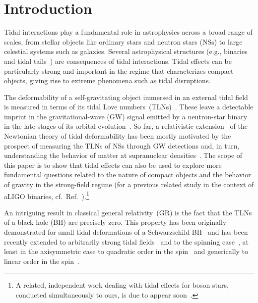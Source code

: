 \documentclass[aps,twocolumn,showpacs,preprintnumbers,nofootinbib,prd,superscriptaddress,groupedaddress,10pt]{revtex4-1}
\begin{document}
\tableofcontents

\section{Introduction}


Tidal interactions play a fundamental role in astrophysics across a broad range of scales, from stellar objects like ordinary stars and neutron stars (NSs) to large celestial systems such as galaxies. Several astrophysical structures (e.g., binaries and tidal tails~\cite{Toomre:1972vt,1977ApJ...213..183P}) are consequences of tidal interactions. Tidal effects can be particularly strong and important in the regime that characterizes compact objects, giving rise to extreme phenomena such as tidal disruptions. 
%

The deformability of a self-gravitating object immersed in an external tidal field is measured in terms of its tidal Love numbers~(TLNs)~\cite{Murraybook,PoissonWill}. These leave a detectable imprint in the gravitational-wave (GW) signal emitted by a neutron-star binary in the late stages of its orbital evolution~\cite{Flanagan:2007ix,Hinderer:2007mb,Hinderer:2016eia}.
%
So far, a relativistic extension~\cite{Hinderer:2007mb,Binnington:2009bb,Damour:2009vw} of the Newtonian theory of tidal deformability has been mostly motivated by the prospect of measuring the TLNs of NSs through GW detections and, in turn, understanding the behavior of matter at supranuclear densities~\cite{Lattimer:2004pg,Hinderer:2009ca,Postnikov:2010yn,Vines:2011ud,Damour:2012yf,DelPozzo:2013ala,Maselli:2013rza}.
%
The scope of this paper is to show that tidal effects can also be used to explore more fundamental questions related to the nature of compact objects and the behavior of gravity in the strong-field regime (for a previous related study in the context of aLIGO binaries, cf.\ Ref.~\cite{Wade:2013hoa}).\footnote{A related, independent work dealing with tidal effects for boson stars, conducted simultaneously to ours, is due to appear soon~\cite{Buonanno:2017}.}

An intriguing result in classical general relativity~(GR) is the fact that the TLNs of a black hole (BH) are precisely zero. This property has been originally demonstrated for small tidal deformations of a Schwarzschild BH~\cite{Binnington:2009bb,Damour:2009vw,Fang:2005qq} and has been recently extended to arbitrarily strong tidal fields~\cite{Gurlebeck:2015xpa} and to the spinning case~\cite{Poisson:2014gka,Pani:2015hfa,Landry:2015zfa}, at least in the axisymmetric case to quadratic order in the spin~\cite{Pani:2015hfa} and generically to linear order in the spin~\cite{Landry:2015zfa}.
\end{document}

